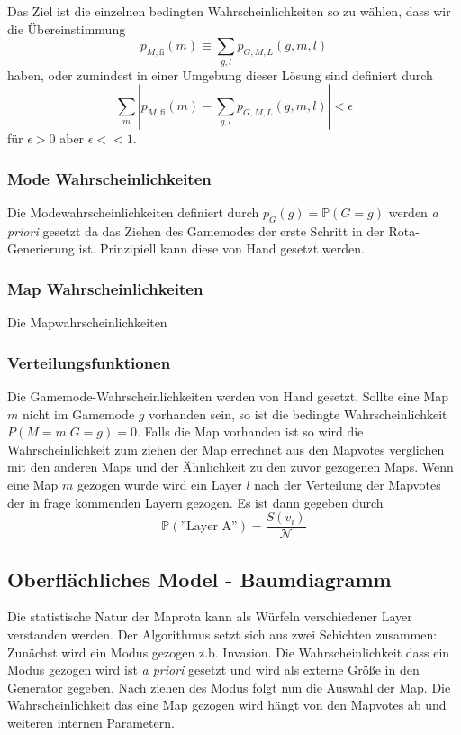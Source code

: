         Das Ziel ist die einzelnen bedingten Wahrscheinlichkeiten so zu wählen, dass wir die Übereinstimmung
        \begin{equation}
            p_{M,\text{fi}}(m) \equiv \sum_{g,l}p_{G,M,L}(g,m,l)
        \end{equation}
        haben, oder zumindest in einer Umgebung dieser Lösung sind definiert durch 
        \begin{equation}
            \sum_m |p_{M,\text{fi}}(m)-\sum_{g,l}p_{G,M,L}(g,m,l)|<\epsilon  
        \end{equation}
        für $\epsilon>0$ aber $\epsilon << 1$.
        \subsubsection{Mode Wahrscheinlichkeiten}
            Die Modewahrscheinlichkeiten definiert durch $p_G(g)=\mathbb{P}(G=g)$ werden \textit{a priori} gesetzt da das Ziehen des Gamemodes der erste Schritt in der Rota-Generierung ist.
            Prinzipiell kann diese von Hand gesetzt werden. 
        \subsubsection{Map Wahrscheinlichkeiten}
            Die Mapwahrscheinlichkeiten              
        \subsubsection{Verteilungsfunktionen}
        Die Gamemode-Wahrscheinlichkeiten werden von Hand gesetzt. 
        Sollte eine Map $m$ nicht im Gamemode $g$ vorhanden sein, so ist die bedingte Wahrscheinlichkeit $P(M=m|G=g) = 0$. 
        Falls die Map vorhanden ist so wird die Wahrscheinlichkeit zum ziehen der Map errechnet aus den Mapvotes verglichen mit den anderen Maps und der Ähnlichkeit zu den zuvor gezogenen Maps.
        Wenn eine Map $m$ gezogen wurde wird ein Layer $l$ nach der Verteilung der Mapvotes der in frage kommenden Layern gezogen. 
        Es ist dann gegeben durch 
        \begin{equation}
            \mathbb{P}(\text{''Layer A''}) = \frac{S(v_i)}{\mathcal{N}}
        \end{equation}
    \subsection{Oberflächliches Model - Baumdiagramm}
        Die statistische Natur der Maprota kann als \glqq{}Würfeln\grqq{} verschiedener Layer verstanden werden. 
        Der Algorithmus setzt sich aus zwei Schichten zusammen: Zunächst wird ein Modus gezogen z.b. \glqq{}Invasion\grqq{}. 
        Die Wahrscheinlichkeit dass ein Modus gezogen wird ist \textit{a priori} gesetzt und wird als externe Größe in den Generator gegeben.
        Nach ziehen des Modus folgt nun die Auswahl der Map. 
        Die Wahrscheinlichkeit das eine Map gezogen wird hängt von den Mapvotes ab und weiteren internen Parametern. 

